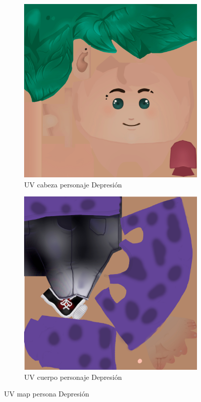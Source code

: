 \documentclass[12pt, a4paper,twoside,titlepage]{book}
\begin{document}
 \begin{figure}
\centering
\begin{subfigure}{.5\textwidth}
  \centering
  \includegraphics[width=.95\linewidth]{TGF/Artes/DEP_head.png}
  \caption{UV cabeza personaje Depresión}
\end{subfigure}%
\begin{subfigure}{.5\textwidth}
  \centering
  \includegraphics[width=.95\linewidth]{TGF/Artes/DEP_body.png}
  \caption{UV cuerpo personaje Depresión}
\end{subfigure}
\caption{UV map persona Depresión}
\label{fig:ArtesDEP1}
\end{figure}
\end{document}

